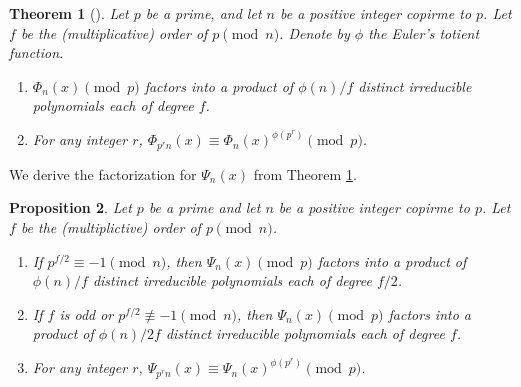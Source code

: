 \documentclass[a4paper, 11pt]{amsart}
\numberwithin{equation}{section}
\newtheorem{thm}{Theorem}[section]
\newtheorem{prop}[thm]{Proposition}
\theoremstyle{definition}
\begin{document}
\begin{thm}[\cite{G}]\label{fact-cycl}
Let $p$ be a prime, and let $n$ be a positive integer copirme to $p$.
Let $f$ be the (multiplicative) order of $p\pmod n$.
Denote by $\phi$ the Euler's totient function.
\begin{enumerate}[{\rm (1)}]
\item
$\Phi_n(x)\pmod p$ factors into a product of $\phi(n)/f$ distinct irreducible polynomials each of degree $f$. 
\item
For any integer $r$, $\Phi_{p^rn}(x)\equiv \Phi_n(x)^{\phi(p^r)}\pmod p$.
\end{enumerate}
\end{thm}

We derive the factorization for $\Psi_n(x)$ from Theorem \ref{fact-cycl}.

\begin{prop}\label{factor-G}
Let $p$ be a prime and let $n$ be a positive integer copirme to $p$.
Let $f$ be the (multiplictive) order of $p\pmod n$.
\begin{enumerate}[{\rm (1)}]
\item
If $p^{f/2}\equiv -1\pmod n$, then $\Psi_n(x)\pmod p$ factors into a product of $\phi(n)/f$ distinct irreducible polynomials each of degree $f/2$. 
\item
If $f$ is odd or $p^{f/2}\not \equiv -1\pmod n$, then $\Psi_n(x)\pmod p$ factors into a product of $\phi(n)/2f$ distinct irreducible polynomials each of degree $f$. 

\item
For any integer $r$, $\Psi_{p^rn}(x)\equiv \Psi_n(x)^{\phi(p^r)}\pmod p$.
\end{enumerate}
\end{prop}
\end{document}
